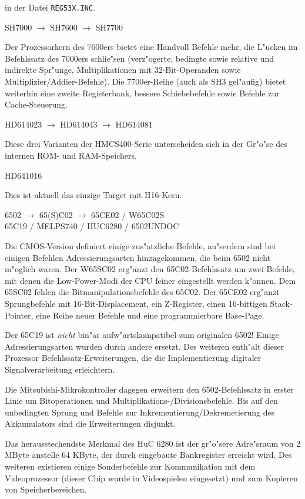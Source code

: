 \documentclass[12pt,a4paper,twoside]{report}
\newcommand{\tty}[1]{{\tt #1}}
\begin{document}
in der Datei \tty{REG53X.INC}.
\begin{cpulist}
   SH7000 $\longrightarrow$ SH7600 $\longrightarrow$ SH7700
\end{cpulist}
Der Prozessorkern des 7600ers bietet eine Handvoll Befehle mehr, die
L"ucken im Befehlssatz des 7000ers schlie"sen (verz"ogerte, bedingte
sowie relative und indirekte Spr"unge, Multiplikationen mit 32-Bit-Operanden
sowie Multiplizier/Addier-Befehle).  Die 7700er-Reihe (auch als SH3
gel"aufig) bietet weiterhin eine zweite Registerbank, bessere
Schiebebefehle sowie Befehle zur Cache-Steuerung.
\begin{cpulist}
   HD614023 $\longrightarrow$ HD614043 $\longrightarrow$ HD614081
\end{cpulist}
Diese drei Varianten der HMCS400-Serie unterscheiden sich in der
Gr"o"se des internen ROM- und RAM-Speichers.
\begin{cpulist}
   HD641016
\end{cpulist}
Dies ist aktuell das einzige Target mit H16-Kern.
\begin{cpulist}
   6502 $\rightarrow$ 65(S)C02 $\rightarrow$ 65CE02 / W65C02S\\
\> 65C19 / MELPS740 / HUC6280 / 6502UNDOC
\end{cpulist}
Die CMOS-Version definiert einige zus"atzliche Befehle, au"serdem sind
bei einigen Befehlen Adressierungsarten hinzugekommen, die beim 6502
nicht m"oglich waren.  Der W65SC02 erg"anzt den
65C02-Befehlssatz um zwei Befehle, mit denen die Low-Power-Modi
der CPU feiner eingestellt werden k"onnen.  Dem 65SC02 fehlen die
Bitmanipulationsbefehle des 65C02.  Der 65CE02 erg"anzt Sprungbefehle
mit 16-Bit-Displacement, ein Z-Register, einen 16-bittigen Stack-Pointer,
eine Reihe neuer Befehle und eine programmierbare Base-Page.

Der 65C19 ist {\em nicht} bin"ar aufw"artskompatibel zum
originalen 6502!  Einige Adressierungsarten wurden durch andere
ersetzt.  Des weiteren enth"alt dieser Prozessor
Befehlssatz-Erweiterungen, die die Implementierung digitaler
Signalverarbeitung erleichtern.

Die Mitsubishi-Mikrokontroller dagegen erweitern den
6502-Befehlssatz in erster Linie um Bitoperationen und
Multiplikations-/Divisionsbefehle.  Bis auf den unbedingten Sprung und
Befehle zur Inkrementierung/Dekremetierung des Akkumulators sind die
Erweiterungen disjunkt.

Das herausstechendste Merkmal des HuC 6280 ist der gr"o"sere
Adre"sraum von 2 MByte anstelle 64 KByte, der durch eingebaute
Bankregister erreicht wird.   Des weiteren existieren einige
Sonderbefehle zur Kommunikation mit dem Videoprozessor (dieser
Chip wurde in Videospielen eingesetzt) und zum Kopieren von
Speicherbereichen.
\end{document}
